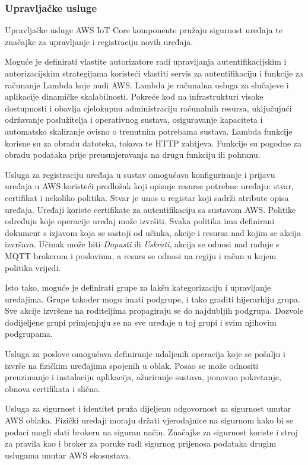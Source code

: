 \subsubsection{Upravljačke usluge}

Upravljačke usluge AWS IoT Core komponente pružaju sigurnost uređaja te značajke za upravljanje i registraciju novih uređaja.

Moguće je definirati vlastite autorizatore radi upravljanja autentifikacijskim i autorizacijskim strategijama koristeći vlastiti servis za autentifikaciju i funkcije za računanje Lambda koje nudi AWS. Lambda je računalna usluga za slučajeve i aplikacije dinamičke skalabilnosti. Pokreće kod na infrastrukturi visoke dostupnosti i obavlja cjelokupnu administraciju računalnih resursa, uključujući održavanje poslužitelja i operativnog sustava, osiguravanje kapaciteta i automatsko skaliranje ovisno o trenutnim potrebama sustava. Lambda funkcije korisne su za obradu datoteka, tokova te HTTP zahtjeva. Funkcije su pogodne za obradu podataka prije preusmjeravanja na drugu funkciju ili pohranu. 

Usluga za registraciju uređaja u sustav  omogućava konfiguriranje i prijavu uređaja u AWS koristeći predložak koji opisuje resurse potrebne uređaju: stvar, certifikat i nekoliko politika. Stvar  je unos u registar koji sadrži atribute opisa uređaja. Uređaji koriste certifikate za autentifikaciju sa sustavom AWS. Politike određuju koje operacije uređaj može izvršiti. Svaka politika ima definirani dokument s izjavom koja se sastoji od učinka, akcije i resursa nad kojim se akcija izvršava. Učinak može biti \textit{Dopusti} ili \textit{Uskrati}, akcija se odnosi nad radnje s MQTT brokerom i poslovima, a resurs se odnosi na regiju i račun u kojem politika vrijedi. 

Isto tako, moguće je definirati grupe za lakšu kategorizaciju i upravljanje uređajima. Grupe također mogu imati podgrupe, i tako graditi hijerarhiju grupa. Sve akcije izvršene na roditeljima propagiraju se do najdubljih podgrupa. Dozvole dodijeljene grupi primjenjuju se na sve uređaje u toj grupi i svim njihovim podgrupama. 

Usluga za poslove  omogućava definiranje udaljenih operacija koje se pošalju i izvrše na fizičkim uređajima spojenih u oblak. Posao se može odnositi preuzimanje i instalaciju aplikacija, ažuriranje sustava, ponovno pokretanje, obnova certifikata i slično.

Usluga za sigurnost i identitet pruža dijeljenu odgovornost za sigurnost unutar AWS oblaka. Fizički uređaji moraju držati vjerodajnice na sigurnom kako bi se podaci mogli slati brokeru na siguran način. Značajke za sigurnost koriste i stroj za pravila kao i broker za poruke radi sigurnog prijenosa podataka drugim uslugama unutar AWS ekosustava.

